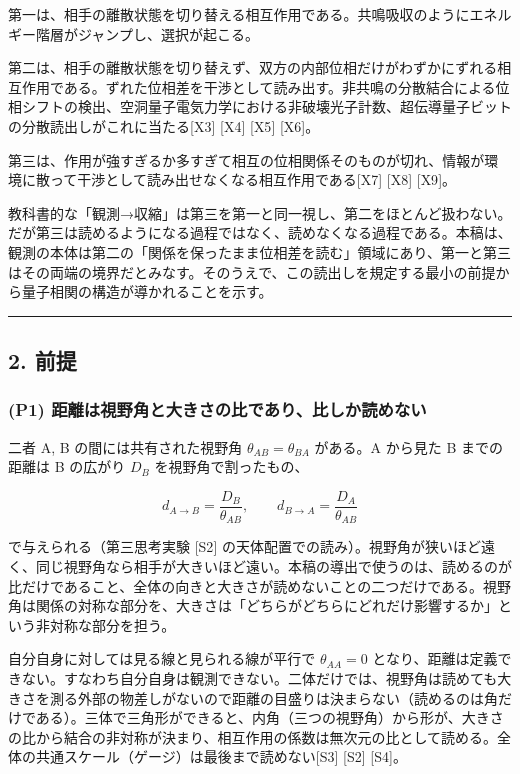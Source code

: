 \documentclass[
  a4paper,
]{ltjsarticle}
\begin{document}
第一は、相手の離散状態を切り替える相互作用である。共鳴吸収のようにエネルギー階層がジャンプし、選択が起こる。

第二は、相手の離散状態を切り替えず、双方の内部位相だけがわずかにずれる相互作用である。ずれた位相差を干渉として読み出す。非共鳴の分散結合による位相シフトの検出、空洞量子電気力学における非破壊光子計数、超伝導量子ビットの分散読出しがこれに当たる{[}X3{]}
{[}X4{]} {[}X5{]} {[}X6{]}。

第三は、作用が強すぎるか多すぎて相互の位相関係そのものが切れ、情報が環境に散って干渉として読み出せなくなる相互作用である{[}X7{]}
{[}X8{]} {[}X9{]}。

教科書的な「観測→収縮」は第三を第一と同一視し、第二をほとんど扱わない。だが第三は読めるようになる過程ではなく、読めなくなる過程である。本稿は、観測の本体は第二の「関係を保ったまま位相差を読む」領域にあり、第一と第三はその両端の境界だとみなす。そのうえで、この読出しを規定する最小の前提から量子相関の構造が導かれることを示す。

\begin{center}\rule{0.5\linewidth}{0.5pt}\end{center}

\subsection{2. 前提}\label{ux524dux63d0}

\subsubsection{(P1)
距離は視野角と大きさの比であり、比しか読めない}\label{p1-ux8dddux96e2ux306fux8996ux91ceux89d2ux3068ux5927ux304dux3055ux306eux6bd4ux3067ux3042ux308aux6bd4ux3057ux304bux8aadux3081ux306aux3044}

二者 A, B の間には共有された視野角 \(\theta_{AB}=\theta_{BA}\) がある。A
から見た B までの距離は B の広がり \(D_B\) を視野角で割ったもの、

\[
d_{A\to B}=\frac{D_B}{\theta_{AB}},\qquad d_{B\to A}=\frac{D_A}{\theta_{AB}}
\]

で与えられる（第三思考実験 {[}S2{]}
の天体配置での読み）。視野角が狭いほど遠く、同じ視野角なら相手が大きいほど遠い。本稿の導出で使うのは、読めるのが比だけであること、全体の向きと大きさが読めないことの二つだけである。視野角は関係の対称な部分を、大きさは「どちらがどちらにどれだけ影響するか」という非対称な部分を担う。

自分自身に対しては見る線と見られる線が平行で \(\theta_{AA}=0\)
となり、距離は定義できない。すなわち自分自身は観測できない。二体だけでは、視野角は読めても大きさを測る外部の物差しがないので距離の目盛りは決まらない（読めるのは角だけである）。三体で三角形ができると、内角（三つの視野角）から形が、大きさの比から結合の非対称が決まり、相互作用の係数は無次元の比として読める。全体の共通スケール（ゲージ）は最後まで読めない{[}S3{]}
{[}S2{]} {[}S4{]}。
\end{document}
